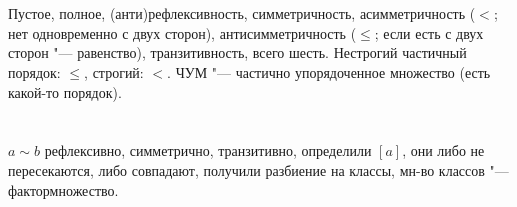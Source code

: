 \section{} %
Пустое, полное, (анти)рефлексивность, симметричность, асимметричность ($<$; нет одновременно с двух сторон), антисимметричность ($\le$; если есть с двух
сторон "--- равенство), транзитивность, всего шесть. Нестрогий частичный порядок: $\le$, строгий: $<$. ЧУМ "--- частично упорядоченное множество (есть какой-то порядок).

\section{} %
$a \sim b$ рефлексивно, симметрично, транзитивно, определили $[a]$, они либо не пересекаются, либо совпадают, получили разбиение на классы, мн-во классов "--- фактормножество.
